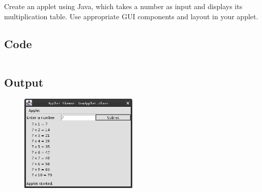 \documentclass[../main.tex]{subfiles}
\begin{document}
Create an applet using Java, which takes a number as input and displays its
multiplication table. Use appropriate GUI components and layout in your applet.

\subsection{Code}
\inputminted[frame=lines, breaklines, breakanywhere, numberblanklines=false]{java}{./programs/prog14/Tables.java}

\newpage
\subsection{Output}
\begin{figure}[h!]
	\centering
	\includegraphics[width=0.5\textwidth]{./assets/p14-s1.png}
\end{figure}
\end{document}

